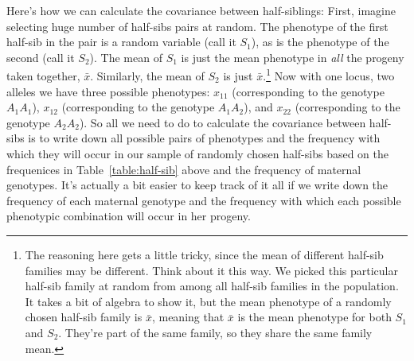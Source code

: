 \documentclass[12pt]{article}
\begin{document}
Here's how we can calculate the covariance between half-siblings:
First, imagine selecting huge number of half-sibs pairs at random.
The phenotype of the first half-sib in the pair is a random variable
(call it $S_1$), as is the phenotype of the second (call it $S_2$).
The mean of $S_1$ is just the mean phenotype in {\it all\/} the
progeny taken together, $\bar x$.  Similarly, the mean of $S_2$ is
just $\bar x$.\footnote{The reasoning here gets a little tricky, since
  the mean of different half-sib families may be different. Think
  about it this way. We picked this particular half-sib family at
  random from among all half-sib families in the population. It takes
  a bit of algebra to show it, but the mean phenotype of a randomly
  chosen half-sib family is $\bar x$, meaning that $\bar x$ is the
  mean phenotype for both $S_1$ and $S_2$. They're part of the same
  family, so they share the same family mean.}  Now with one locus,
two alleles we have three possible phenotypes: $x_{11}$ (corresponding
to the genotype $A_1A_1$), $x_{12}$ (corresponding to the genotype
$A_1A_2$), and $x_{22}$ (corresponding to the genotype $A_2A_2$).  So
all we need to do to calculate the covariance between half-sibs is to
write down all possible pairs of phenotypes and the frequency with
which they will occur in our sample of randomly chosen half-sibs based
on the frequenices in Table~\ref{table:half-sib} above and the
frequency of maternal genotypes.  It's actually a bit easier to keep
track of it all if we write down the frequency of each maternal
genotype and the frequency with which each possible phenotypic
combination will occur in her progeny.
\end{document}
